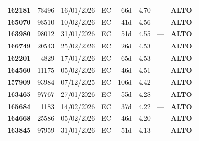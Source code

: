 \documentclass[a4paper,10pt]{article}
\begin{document}
\begin{center}
\begin{longtable}{>{\scriptsize}r>{\scriptsize}r>{\scriptsize}c>{\scriptsize}c>{\scriptsize}r>{\scriptsize}r>{\scriptsize}r>{\scriptsize}l}
\textcolor{anomorange}{\textbf{162181}} & 78496 & 16/01/2026 & \textcolor{anomorange}{EC} & 66d & \textcolor{anomorange}{4.70} & --- & \textcolor{anomorange}{\textbf{ALTO}} \\

\textcolor{anomorange}{\textbf{165070}} & 98510 & 10/02/2026 & \textcolor{anomorange}{EC} & 41d & \textcolor{anomorange}{4.56} & --- & \textcolor{anomorange}{\textbf{ALTO}} \\

\textcolor{anomorange}{\textbf{163980}} & 98012 & 31/01/2026 & \textcolor{anomorange}{EC} & 51d & \textcolor{anomorange}{4.55} & --- & \textcolor{anomorange}{\textbf{ALTO}} \\

\textcolor{anomorange}{\textbf{166749}} & 20543 & 25/02/2026 & \textcolor{anomorange}{EC} & 26d & \textcolor{anomorange}{4.53} & --- & \textcolor{anomorange}{\textbf{ALTO}} \\

\textcolor{anomorange}{\textbf{162201}} & 4829 & 17/01/2026 & \textcolor{anomorange}{EC} & 65d & \textcolor{anomorange}{4.53} & --- & \textcolor{anomorange}{\textbf{ALTO}} \\

\textcolor{anomorange}{\textbf{164560}} & 11175 & 05/02/2026 & \textcolor{anomorange}{EC} & 46d & \textcolor{anomorange}{4.51} & --- & \textcolor{anomorange}{\textbf{ALTO}} \\

\textcolor{anomorange}{\textbf{157909}} & 93984 & 07/12/2025 & \textcolor{anomorange}{EC} & 106d & \textcolor{anomorange}{4.42} & --- & \textcolor{anomorange}{\textbf{ALTO}} \\

\textcolor{anomorange}{\textbf{163465}} & 97767 & 27/01/2026 & \textcolor{anomorange}{EC} & 55d & \textcolor{anomorange}{4.28} & --- & \textcolor{anomorange}{\textbf{ALTO}} \\

\textcolor{anomorange}{\textbf{165684}} & 1183 & 14/02/2026 & \textcolor{anomorange}{EC} & 37d & \textcolor{anomorange}{4.22} & --- & \textcolor{anomorange}{\textbf{ALTO}} \\

\textcolor{anomorange}{\textbf{164668}} & 25586 & 05/02/2026 & \textcolor{anomorange}{EC} & 46d & \textcolor{anomorange}{4.20} & --- & \textcolor{anomorange}{\textbf{ALTO}} \\

\textcolor{anomorange}{\textbf{163845}} & 97959 & 31/01/2026 & \textcolor{anomorange}{EC} & 51d & \textcolor{anomorange}{4.13} & --- & \textcolor{anomorange}{\textbf{ALTO}} \\


\end{longtable}
\end{center}
\end{document}
